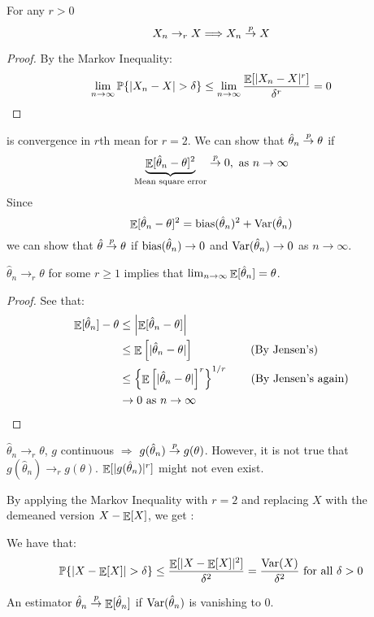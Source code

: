 \documentclass[10pt]{article}
\begin{document}
\begin{theorem}
	For any $r > 0$
	\[
	X_n \to_r X \Longrightarrow X_n \overset{p}{\to} X
	\]
\end{theorem}
\begin{proof}
	By the Markov Inequality:
	\[
	\lim_{n\to\infty} \mathbb{P}\{|X_n - X| > \delta\} \le \lim_{n\to\infty} \frac{\mathop{\mathbb{E}}[|X_n - X|^r]}{\delta^r} = 0
	\]
\end{proof}

\begin{example}
	 is convergence in $r$th mean for $r = 2$. We can show that $\hat{\theta}_n \overset{p}{\to} \theta$ if 
	\[
	\underbrace{\mathop{\mathbb{E}}[\hat{\theta}_n - \theta]^2}_{\text{Mean square error}} \overset{p}{\to} 0,\text{ as } n \to \infty
	\]
	Since
	\[
	\mathop{\mathbb{E}}[\hat{\theta}_n - \theta]^2 = \mathop{\rm bias}(\hat{\theta}_n)^2 + \mathop{\rm Var}(\hat{\theta}_n)
	\]
	we can show that $\hat{\theta} \overset{p}{\to} \theta$ if $\mathop{\rm bias}(\hat{\theta}_n) \to 0$ and $\mathop{\rm Var}(\hat{\theta}_n) \to 0$ as $n \to \infty$. 
\end{example}

\begin{theorem}
	$\hat{\theta}_n \to_r \theta$ for some $r \ge 1$ implies that $\lim_{n\to\infty} \mathop{\mathbb{E}}[\hat{\theta}_n] = \theta$.
\end{theorem}
\begin{proof}
	See that:
	\begin{align*}
		\mathop{\mathbb{E}}[\hat{\theta}_n] - \theta &\le \left|\mathop{\mathbb{E}}[\hat{\theta}_n - \theta]\right| \\
		&\le \mathop{\mathbb{E}}\left[ | \hat{\theta}_n - \theta| \right] \qquad \qquad\quad\text{(By Jensen's)} \\
		&\le \left\{\mathop{\mathbb{E}}\left[ | \hat{\theta}_n - \theta| \right]^r\right\}^{1/r} \qquad \text{(By Jensen's again)} \\
		&\to 0 \text{ as } n \to \infty
	\end{align*}
\end{proof}

\begin{remark}
	$\hat{\theta}_n \to_r \theta$, $g$ continuous $\Rightarrow$ $g(\hat{\theta}_n) \overset{p}{\to} g(\theta)$. However, it is not true that $g(\hat{\theta}_n) \to_r g(\theta)$. $\mathop{\mathbb{E}}[|g(\hat{\theta}_n)|^r]$ might not even exist.
\end{remark}

By applying the Markov Inequality with $r = 2$ and replacing $X$ with the demeaned version $X - \mathop{\mathbb{E}}[ X]$, we get :
\begin{definition} 
We have that:
	\[
	\mathbb{P}\{|X - \mathop{\mathbb{E}}[X]| > \delta\} \le \frac{\mathop{\mathbb{E}}[ |X - \mathop{\mathbb{E}}[X]|^2]}{\delta^2} = \frac{\mathop{\rm Var}(X)}{\delta^2} \text{ for all } \delta > 0
	\]
\end{definition}
\begin{remark}
	An estimator $\hat{\theta}_n \overset{p}{\to} \mathop{\mathbb{E}}[\hat{\theta}_n]$ if $\mathop{\rm Var}(\hat{\theta}_n)$ is vanishing to 0. 
\end{remark}
\end{document}

